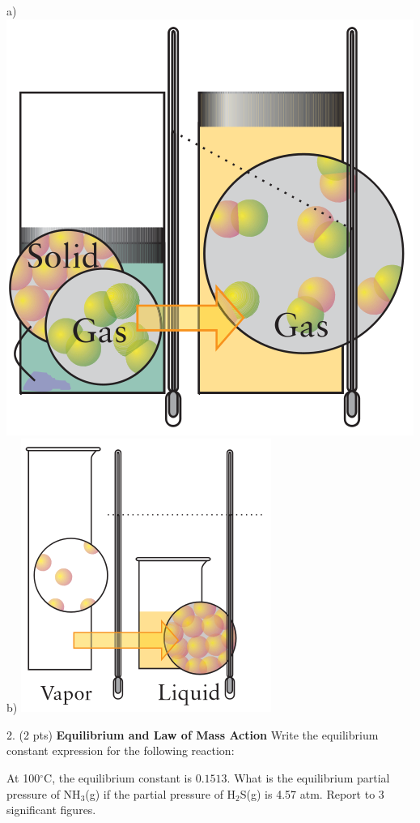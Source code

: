 \documentclass[11pt]{article}
\begin{document}
\begin{center}
  a) \includegraphics[scale=0.25]{entropy.png}
  b) \includegraphics[scale=0.38]{entropy2.png}
\end{center}

\pagebreak

2. (2 pts) \textbf{Equilibrium and Law of Mass Action} Write the equilibrium constant
expression for the following reaction:
\begin{center}
\end{center}
At 100$^\circ$C, the equilibrium constant is $0.1513$. What is the equilibrium
partial pressure of NH$_3$(g) if the partial pressure of H$_2$S(g) is 4.57 atm. Report
to 3 significant figures.
\end{document}
